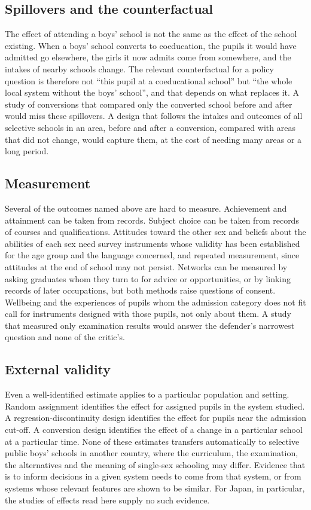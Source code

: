 \documentclass[11pt]{article}
\begin{document}
\subsection{Spillovers and the counterfactual}

The effect of attending a boys' school is not the same as the effect of the school existing. When a boys' school converts to coeducation, the pupils it would have admitted go elsewhere, the girls it now admits come from somewhere, and the intakes of nearby schools change. The relevant counterfactual for a policy question is therefore not ``this pupil at a coeducational school'' but ``the whole local system without the boys' school'', and that depends on what replaces it. A study of conversions that compared only the converted school before and after would miss these spillovers. A design that follows the intakes and outcomes of all selective schools in an area, before and after a conversion, compared with areas that did not change, would capture them, at the cost of needing many areas or a long period.

\subsection{Measurement}

Several of the outcomes named above are hard to measure. Achievement and attainment can be taken from records. Subject choice can be taken from records of courses and qualifications. Attitudes toward the other sex and beliefs about the abilities of each sex need survey instruments whose validity has been established for the age group and the language concerned, and repeated measurement, since attitudes at the end of school may not persist. Networks can be measured by asking graduates whom they turn to for advice or opportunities, or by linking records of later occupations, but both methods raise questions of consent. Wellbeing and the experiences of pupils whom the admission category does not fit call for instruments designed with those pupils, not only about them. A study that measured only examination results would answer the defender's narrowest question and none of the critic's.

\subsection{External validity}

Even a well-identified estimate applies to a particular population and setting. Random assignment identifies the effect for assigned pupils in the system studied. A regression-discontinuity design identifies the effect for pupils near the admission cut-off. A conversion design identifies the effect of a change in a particular school at a particular time. None of these estimates transfers automatically to selective public boys' schools in another country, where the curriculum, the examination, the alternatives and the meaning of single-sex schooling may differ. Evidence that is to inform decisions in a given system needs to come from that system, or from systems whose relevant features are shown to be similar. For Japan, in particular, the studies of effects read here supply no such evidence.
\end{document}
